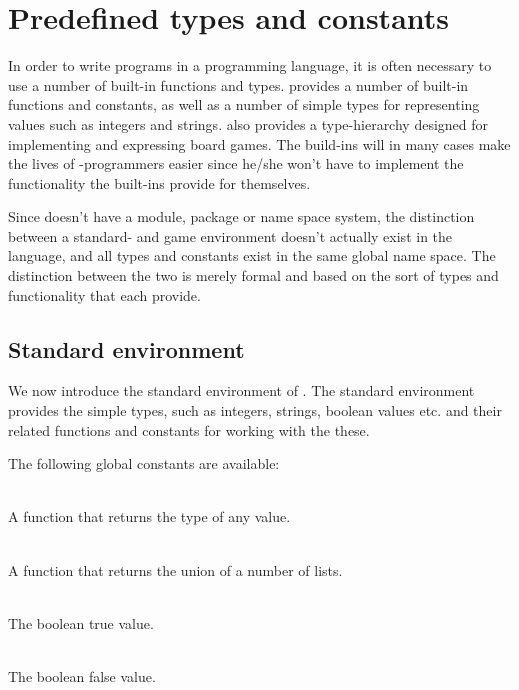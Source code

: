 \section{Predefined types and constants}
\label{sec:predefined}

In order to write programs in a programming language, it is often necessary to use a number of built-in
functions and types. \productname{} provides a number of built-in functions and constants, as well as 
a number of simple types for representing values such as integers and strings. \productname{} also provides
a type-hierarchy designed for implementing and expressing board games. The build-ins will in many cases make
the lives of \productname{}-programmers easier since he/she won't have to implement the functionality the built-ins
provide for themselves. 

Since \productname{} doesn't have a module, package or name space system, the distinction between a standard-
and game environment doesn't actually exist in the language, and all types and constants exist in the same
global name space. The distinction between the two is merely formal and based on the sort of types and functionality
that each provide.
 
\subsection{Standard environment}
\label{sec:standardenvironment}

We now introduce the standard environment of \productname{}. The standard environment provides the simple types, such as
integers, strings, boolean values etc. and their related functions and constants for working with the these.

The following global constants are available:

\begin{dlist}
  \item {}\\
    A function that returns the type of any value.
  \item {}\\
    A function that returns the union of a number of lists.
  \item {}\\
    The boolean true value.
  \item {}\\
    The boolean false value.
\end{dlist}


